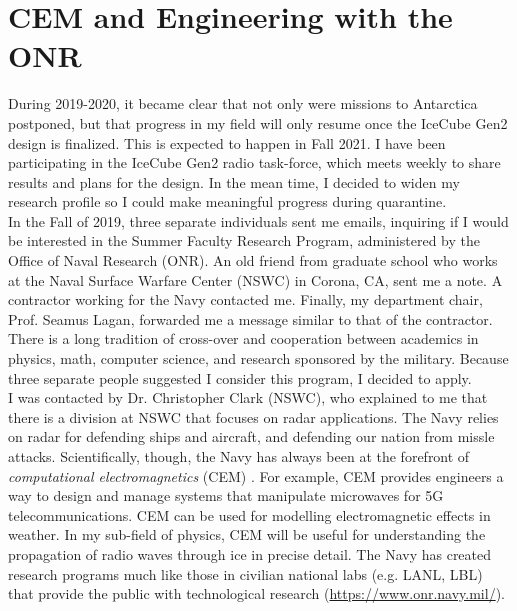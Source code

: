 \documentclass[../../../main.tex]{subfiles}
\begin{document}
\section{CEM and Engineering with the ONR}
\label{sec:naval_research}

During 2019-2020, it became clear that not only were missions to Antarctica postponed, but that progress in my field will only resume once the IceCube Gen2 design is finalized.  This is expected to happen in Fall 2021.  I have been participating in the IceCube Gen2 radio task-force, which meets weekly to share results and plans for the design.  In the mean time, I decided to widen my research profile so I could make meaningful progress during quarantine.
\\
\vspace{0.25cm}
In the Fall of 2019, three separate individuals sent me emails, inquiring if I would be interested in the Summer Faculty Research Program, administered by the Office of Naval Research (ONR).  An old friend from graduate school who works at the Naval Surface Warfare Center (NSWC) in Corona, CA, sent me a note.  A contractor working for the Navy contacted me.  Finally, my department chair, Prof. Seamus Lagan, forwarded me a message similar to that of the contractor.  There is a long tradition of cross-over and cooperation between academics in physics, math, computer science, and research sponsored by the military.  Because three separate people suggested I consider this program, I decided to apply.
\\
\vspace{0.25cm}
I was contacted by Dr. Christopher Clark (NSWC), who explained to me that there is a division at NSWC that focuses on radar applications.  The Navy relies on radar for defending ships and aircraft, and defending our nation from missle attacks.  Scientifically, though, the Navy has always been at the forefront of \textit{computational electromagnetics} (CEM) \cite{cem}.  For example, CEM provides engineers a way to design and manage systems that manipulate microwaves for 5G telecommunications.  CEM can be used for modelling electromagnetic effects in weather.  In my sub-field of physics, CEM will be useful for understanding the propagation of radio waves through ice in precise detail.  The Navy has created research programs much like those in civilian national labs (e.g. LANL, LBL) that provide the public with technological research (\url{https://www.onr.navy.mil/}).
\\
\vspace{0.25cm}
\end{document}
